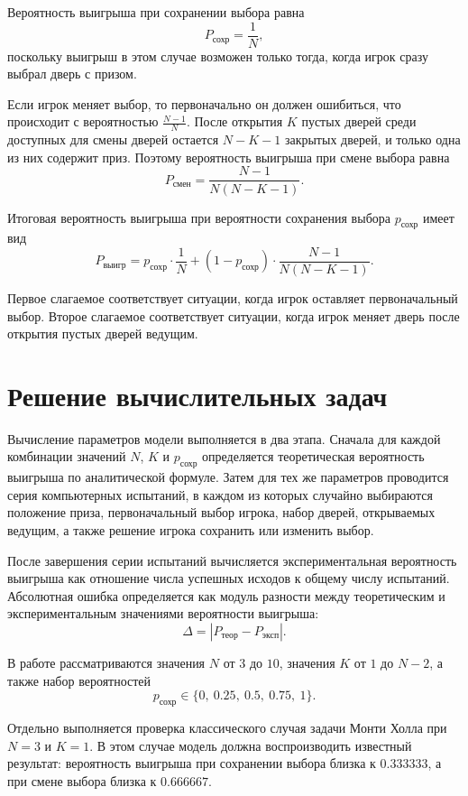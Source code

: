 \documentclass[a4paper, 14pt]{extarticle}
\begin{document}
Вероятность выигрыша при сохранении выбора равна
\[
P_{\text{сохр}} = \frac{1}{N},
\]
поскольку выигрыш в этом случае возможен только тогда, когда игрок сразу выбрал дверь с призом.

Если игрок меняет выбор, то первоначально он должен ошибиться, что происходит с вероятностью $\frac{N-1}{N}$. После открытия $K$ пустых дверей среди доступных для смены дверей остается $N-K-1$ закрытых дверей, и только одна из них содержит приз. Поэтому вероятность выигрыша при смене выбора равна
\[
P_{\text{смен}} = \frac{N-1}{N(N-K-1)}.
\]

Итоговая вероятность выигрыша при вероятности сохранения выбора $p_{\text{сохр}}$ имеет вид
\[
P_{\text{выигр}} = p_{\text{сохр}} \cdot \frac{1}{N} + \left(1 - p_{\text{сохр}}\right)\cdot \frac{N-1}{N(N-K-1)}.
\]

Первое слагаемое соответствует ситуации, когда игрок оставляет первоначальный выбор. Второе слагаемое соответствует ситуации, когда игрок меняет дверь после открытия пустых дверей ведущим.

\section{Решение вычислительных задач}

Вычисление параметров модели выполняется в два этапа. Сначала для каждой комбинации значений $N$, $K$ и $p_{\text{сохр}}$ определяется теоретическая вероятность выигрыша по аналитической формуле. Затем для тех же параметров проводится серия компьютерных испытаний, в каждом из которых случайно выбираются положение приза, первоначальный выбор игрока, набор дверей, открываемых ведущим, а также решение игрока сохранить или изменить выбор.

После завершения серии испытаний вычисляется экспериментальная вероятность выигрыша как отношение числа успешных исходов к общему числу испытаний. Абсолютная ошибка определяется как модуль разности между теоретическим и экспериментальным значениями вероятности выигрыша:
\[
\Delta = \left| P_{\text{теор}} - P_{\text{эксп}} \right|.
\]

В работе рассматриваются значения $N$ от $3$ до $10$, значения $K$ от $1$ до $N-2$, а также набор вероятностей
\[
p_{\text{сохр}} \in \{0,\ 0.25,\ 0.5,\ 0.75,\ 1\}.
\]

Отдельно выполняется проверка классического случая задачи Монти Холла при $N = 3$ и $K = 1$. В этом случае модель должна воспроизводить известный результат: вероятность выигрыша при сохранении выбора близка к $0.333333$, а при смене выбора близка к $0.666667$.
\end{document}
